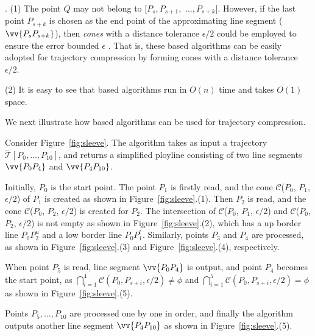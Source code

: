 . (1) The point $Q$ may not belong to $[P_{s}, P_{s+1},$ $\ldots, P_{s+k}]$.
However, if the last point $P_{s+k}$ is chosen as the end point of the approximating line segment (\ie $\vv{P_sP_{s+k}}$), then \emph{cones} with a distance tolerance $\epsilon/2$ could be employed to ensure the \ped error bounded $\epsilon$ \cite{Zhao:Sleeve}. That is, these \cia based algorithms can be easily adopted for trajectory compression by forming cones with a distance tolerance $\epsilon/2$. 

\ni(2) It is easy to see that \cia based algorithms  run in $O(n)$ time and takes $O(1)$ space.


We next illustrate how \cia based algorithms can be used for trajectory compression.

\begin{example}
\label{exm-alg-sleeve}
Consider Figure~\ref{fig:sleeve}. The \cia algorithm takes as input a trajectory $\dddot{\mathcal{T}}[P_0, \ldots, P_{10}]$, and returns a simplified ployline consisting of two line segments $\vv{P_0P_4}$ and  $\vv{P_4P_{10}}$.
 
Initially, $P_0$ is the start point. The point $P_1$ is firstly read, and the cone $\mathcal{C}$($P_0$, $P_{1}$, $\epsilon/2$) of $P_1$ is created as shown in Figure~\ref{fig:sleeve}.(1).
Then $P_2$ is read, and the cone $\mathcal{C}$($P_0$, $P_{2}$, $\epsilon/2$) is created for $P_2$. The intersection of $\mathcal{C}$($P_0$, $P_{1}$, $\epsilon/2$) and $\mathcal{C}$($P_0$, $P_{2}$, $\epsilon/2$) is not empty as shown in Figure~\ref{fig:sleeve}.(2), which has a up border line $P_0P_2^u$ and a low border line $P_0P_1^l$.
%
Similarly, points $P_3$ and $P_4$ are processed, as shown in Figure~\ref{fig:sleeve}.(3) and Figure~\ref{fig:sleeve}.(4), respectively.

When point $P_5$ is read,  line segment $\vv{P_0P_4}$ is output, and point $P_4$ becomes the start point, as $\bigcap_{i=1}^{4}\mathcal{C}(P_0, P_{s+i}, \epsilon/2) \ne \phi$ and $\bigcap_{i=1}^{5}\mathcal{C}(P_0, P_{s+i}, \epsilon/2) = \phi$ as shown in Figure~\ref{fig:sleeve}.(5).


Points $P_5, \ldots, P_{10}$ are processed one by one in order, and finally the algorithm outputs another line segment $\vv{P_4P_{10}}$ as shown in Figure~\ref{fig:sleeve}.(5).
\end{example}




